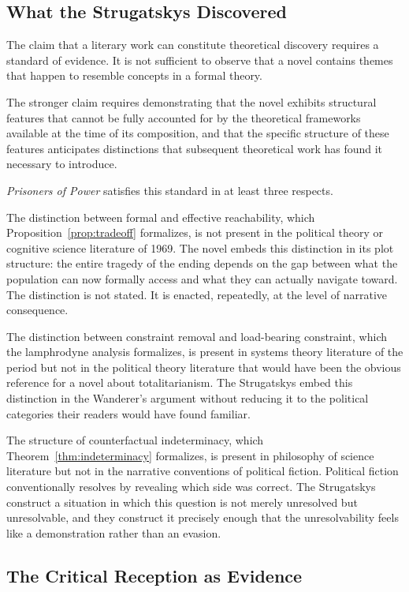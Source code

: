 \documentclass[12pt, a4paper]{article}
\theoremstyle{plain}
\theoremstyle{definition}
\theoremstyle{remark}
\begin{document}
\subsection{What the Strugatskys Discovered}

The claim that a literary work can constitute
theoretical discovery requires a standard of
evidence. It is not sufficient to observe that
a novel contains themes that happen to resemble
concepts in a formal theory.

The stronger claim requires demonstrating that
the novel exhibits structural features that cannot
be fully accounted for by the theoretical
frameworks available at the time of its composition,
and that the specific structure of these features
anticipates distinctions that subsequent
theoretical work has found it necessary to introduce.

\textit{Prisoners of Power} satisfies this standard
in at least three respects.

The distinction between formal and effective
reachability, which Proposition~\ref{prop:tradeoff}
formalizes, is not present in the political theory
or cognitive science literature of 1969. The novel
embeds this distinction in its plot structure: the
entire tragedy of the ending depends on the gap
between what the population can now formally access
and what they can actually navigate toward. The
distinction is not stated. It is enacted,
repeatedly, at the level of narrative consequence.

The distinction between constraint removal and
load-bearing constraint, which the lamphrodyne
analysis formalizes, is present in systems theory
literature of the period but not in the political
theory literature that would have been the obvious
reference for a novel about totalitarianism. The
Strugatskys embed this distinction in the
Wanderer's argument without reducing it to the
political categories their readers would have
found familiar.

The structure of counterfactual indeterminacy,
which Theorem~\ref{thm:indeterminacy} formalizes,
is present in philosophy of science literature
but not in the narrative conventions of political
fiction. Political fiction conventionally resolves
by revealing which side was correct. The
Strugatskys construct a situation in which this
question is not merely unresolved but unresolvable,
and they construct it precisely enough that the
unresolvability feels like a demonstration
rather than an evasion.

\subsection{The Critical Reception as Evidence}
\end{document}
